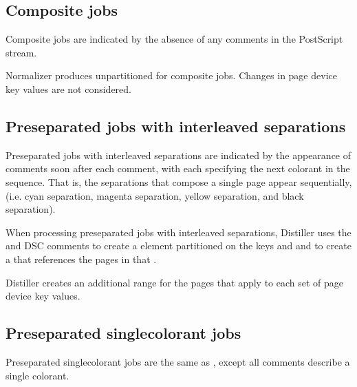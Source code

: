 \documentclass[letterpaper,12pt,english,openany,oneside]{sphinxmanual}
\begin{document}
\subsection{Composite jobs}
\label{\detokenize{PDF_Create_JDF:composite-jobs}}
Composite jobs are indicated by the absence of any  comments in the PostScript stream.

Normalizer produces un\sphinxhyphen{}partitioned  for composite jobs. Changes in page device key values are not considered.




\subsection{Pre\sphinxhyphen{}separated jobs with interleaved separations}
\label{\detokenize{PDF_Create_JDF:pre-separated-jobs-with-interleaved-separations}}
Pre\sphinxhyphen{}separated jobs with interleaved separations are indicated by the appearance of  comments soon after each  comment, with each  specifying the next colorant in the sequence. That is, the separations that compose a single page appear sequentially, (i.e. cyan separation, magenta separation, yellow separation, and black separation).

When processing pre\sphinxhyphen{}separated jobs with interleaved separations, Distiller uses the  and  DSC comments to create a  element partitioned on the keys  and  and to create a  that references the pages in that  .

Distiller creates an additional  range for the pages that apply to each set of page device key values.


\subsection{Pre\sphinxhyphen{}separated single\sphinxhyphen{}colorant jobs}
\label{\detokenize{PDF_Create_JDF:pre-separated-single-colorant-jobs}}
Pre\sphinxhyphen{}separated single\sphinxhyphen{}colorant jobs are the same as , except all  comments describe a single colorant.
\end{document}
